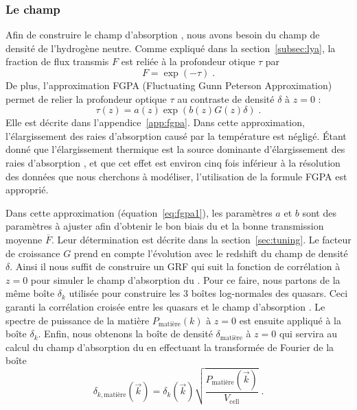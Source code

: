 \subsubsection{Le champ \lya{}}
\label{subsubsec:lya_field}
Afin de construire le champ d'absorption \lya{}, nous avons besoin du champ de densité de l'hydrogène neutre. Comme expliqué dans la section~\ref{subsec:lya}, la fraction de flux transmis $F$ est reliée à la profondeur otique $\tau$ par
\begin{equation}
  F = \exp(- \tau) \; .
\end{equation}
De plus, l'approximation FGPA (Fluctuating Gunn Peterson Approximation) permet de relier la profondeur optique $\tau$ au contraste de densité $\delta$ à $z = 0$ :
\begin{equation}
  \label{eq:fgpa1}
  \tau(z) = a(z) \exp(b(z) G(z) \delta) \; .
\end{equation}
Elle est décrite dans l'appendice~\ref{app:fgpa}.
Dans cette approximation, l'élargissement des raies d'absorption causé par la température est négligé. Étant donné que l'élargissement thermique est la source dominante d'élargissement des raies d'absorption \lya{}, et que cet effet est environ cinq fois inférieur à la résolution des données que nous cherchons à modéliser, l'utilisation de la formule FGPA est approprié.

Dans cette approximation (équation~\ref{eq:fgpa1}), les paramètres $a$ et $b$ sont des paramètres à ajuster afin d'obtenir le bon biais du \lya{} et la bonne transmission moyenne $\overline F$. Leur détermination est décrite dans la section~\ref{sec:tuning}. Le facteur de croissance $G$ prend en compte l'évolution avec le redshift du champ de densité $\delta$. Ainsi il nous suffit de construire un GRF qui suit la fonction de corrélation à $z=0$ pour simuler le champ d'absorption du \lya{}. Pour ce faire, nous partons de la même boîte $\delta_k$ utilisée pour construire les 3 boîtes log-normales des quasars. Ceci garanti la corrélation croisée entre les quasars et le champ d'absorption \lya{}. Le spectre de puissance de la matière $P_{\mathrm{matière}}(k)$ à $z=0$ est ensuite appliqué à la boîte $\delta_k$. Enfin, nous obtenons la boîte de densité $\delta_{\mathrm{matière}}$ à $z = 0$ qui servira au calcul du champ d'absorption du \lya{} en effectuant la transformée de Fourier de la boîte
\begin{equation}
  \delta_{k, \mathrm{matière}}(\vec k)  = \delta_k(\vec k) \sqrt{\frac{P_{\mathrm{matière}}(\vec k)}{V_{\mathrm{cell}}}} \; .
\end{equation}


